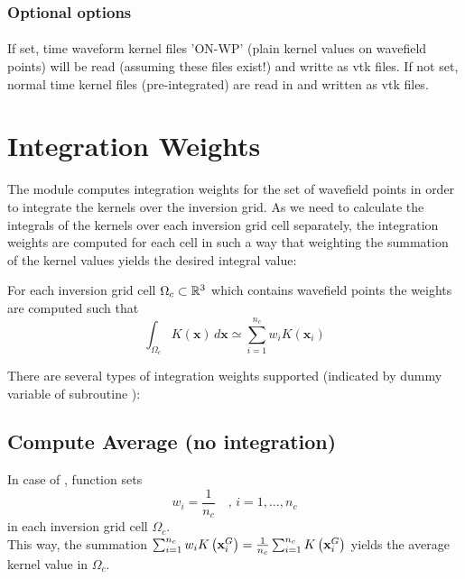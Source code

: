 \subsubsection{Optional options}
\paragraph{}
If set, time waveform kernel files 'ON-WP' (plain kernel values on wavefield points) will be read (assuming these files 
exist!) and writte as vtk files. If not set, normal time kernel files (pre-integrated) are read in and written as vtk files.
%
%
\section{Integration Weights} \label{programs_scripts,sec:fmod_intw}
%
The \ASKI{} module  computes integration weights for the set of wavefield points 
in order to integrate the kernels over the inversion grid. As we need to calculate the integrals of the 
kernels over each inversion grid cell separately, the integration weights are computed for each cell in 
such a way that weighting the summation of the kernel values yields the desired integral value:

For each inversion grid cell $\Omega_c \subset \mathbb{R}^3$ which contains wavefield points \wpG the weights 
\weights are computed such that
\begin{equation} \label{programs_scripts,sec:fmod_intw,eq:integration_global}
\int_{\Omega_c} K(\mathbf{x})\,d\mathbf{x} \simeq \sum_{i=1}^{n_c} w_iK(\mathbf{x}_i)
\end{equation}

There are several types of integration weights supported (indicated by dummy variable  of 
subroutine ):
%
\setcounter{subsection}{-1}
\subsection{Compute Average (no integration)} \label{programs_scripts,sec:fmod_intw,sub:average}
%
In case of , function  sets 
\[w_i = \frac{1}{n_c} \quad ,\, i=1,\dots,n_c\]
in each inversion grid cell $\Omega_c$.\\
This way, the summation $\sum_{i=1}^{n_c} w_iK\left( \mathbf{x}_i^G \right) = \frac{1}{n_c} \sum_{i=1}^{n_c} 
K\left( \mathbf{x}_i^G \right)$ yields the average kernel value in $\Omega_c$.

